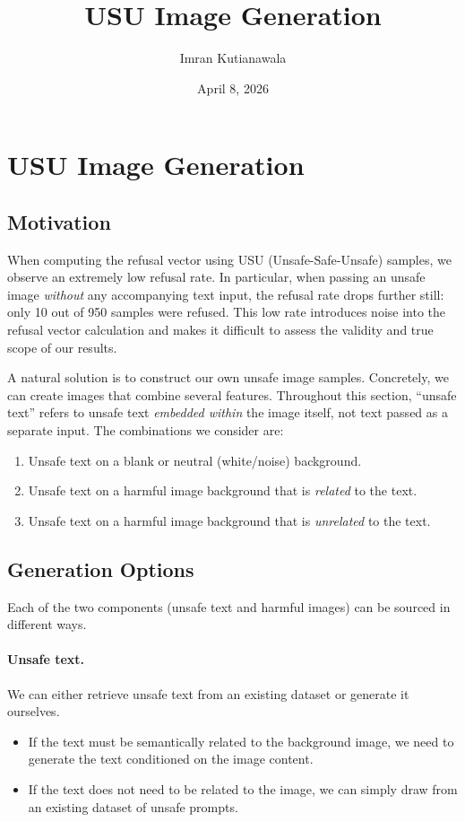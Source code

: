 \documentclass[11pt]{article}
\title{USU Image Generation}
\author{Imran Kutianawala}
\date{April 8, 2026}
\begin{document}
\maketitle

\section{USU Image Generation}
\label{sec:usu-generation}

\subsection{Motivation}

When computing the refusal vector using USU (Unsafe-Safe-Unsafe) samples, we observe an extremely low refusal rate. In particular, when passing an unsafe image \textit{without} any accompanying text input, the refusal rate drops further still: only 10 out of 950 samples were refused. This low rate introduces noise into the refusal vector calculation and makes it difficult to assess the validity and true scope of our results.

A natural solution is to construct our own unsafe image samples. Concretely, we can create images that combine several features. Throughout this section, ``unsafe text'' refers to unsafe text \textit{embedded within} the image itself, not text passed as a separate input. The combinations we consider are:

\begin{enumerate}
    \item Unsafe text on a blank or neutral (white/noise) background.
    \item Unsafe text on a harmful image background that is \textit{related} to the text.
    \item Unsafe text on a harmful image background that is \textit{unrelated} to the text.
\end{enumerate}

\subsection{Generation Options}

Each of the two components (unsafe text and harmful images) can be sourced in different ways.

\paragraph{Unsafe text.} We can either retrieve unsafe text from an existing dataset or generate it ourselves.
\begin{itemize}
    \item If the text must be semantically related to the background image, we need to generate the text conditioned on the image content.
    \item If the text does not need to be related to the image, we can simply draw from an existing dataset of unsafe prompts.
\end{itemize}
\end{document}
